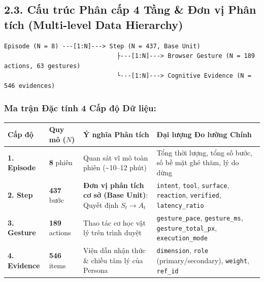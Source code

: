 \documentclass[11pt]{article}
\newcounter{none}
\begin{document}
    \subsection{2.3. Cấu trúc Phân cấp 4 Tầng \& Đơn vị Phân tích
(Multi-level Data
Hierarchy)}\label{cux1ea5u-truxfac-phuxe2n-cux1ea5p-4-tux1ea7ng-ux111ux1a1n-vux1ecb-phuxe2n-tuxedch-multi-level-data-hierarchy}

\begin{verbatim}
Episode (N = 8) ---[1:N]---> Step (N = 437, Base Unit)
                               ├---[1:N]---> Browser Gesture (N = 189 actions, 63 gestures)
                               └---[1:N]---> Cognitive Evidence (N = 546 evidences)
\end{verbatim}

\subsubsection{Ma trận Đặc tính 4 Cấp độ Dữ
liệu:}\label{ma-trux1eadn-ux111ux1eb7c-tuxednh-4-cux1ea5p-ux111ux1ed9-dux1eef-liux1ec7u}

{\def\LTcaptype{none} %
\begin{longtable}[]{@{}
  >{\raggedright\arraybackslash}p{}
  >{\centering\arraybackslash}p{}
  >{\raggedright\arraybackslash}p{}
  >{\raggedright\arraybackslash}p{}@{}}
\toprule\noalign{}
\begin{minipage}[b]{\linewidth}\raggedright
Cấp độ
\end{minipage} & \begin{minipage}[b]{\linewidth}\centering
Quy mô (\(N\))
\end{minipage} & \begin{minipage}[b]{\linewidth}\raggedright
Ý nghĩa Phân tích
\end{minipage} & \begin{minipage}[b]{\linewidth}\raggedright
Đại lượng Đo lường Chính
\end{minipage} \\
\midrule\noalign{}
\endhead
\bottomrule\noalign{}
\endlastfoot
\textbf{1. Episode} & \textbf{8} phiên & Quan sát vĩ mô toàn phiên
(\textasciitilde10--12 phút) & Tổng thời lượng, tổng số bước, số bề mặt
ghé thăm, lý do dừng \\
\textbf{2. Step} & \textbf{437} bước & \textbf{Đơn vị phân tích cơ sở
(Base Unit)}: Quyết định \(S_t \rightarrow A_t\) & \texttt{intent},
\texttt{tool}, \texttt{surface}, \texttt{reaction}, \texttt{verified},
\texttt{latency\_ratio} \\
\textbf{3. Gesture} & \textbf{189} actions & Thao tác cơ học vật lý trên
trình duyệt & \texttt{gesture\_pace}, \texttt{gesture\_ms},
\texttt{gesture\_total\_px}, \texttt{execution\_mode} \\
\textbf{4. Evidence} & \textbf{546} items & Viện dẫn nhận thức \& chiều
tâm lý của Persona & \texttt{dimension}, \texttt{role}
(primary/secondary), \texttt{weight}, \texttt{ref\_id} \\
\end{longtable}
}
\end{document}

